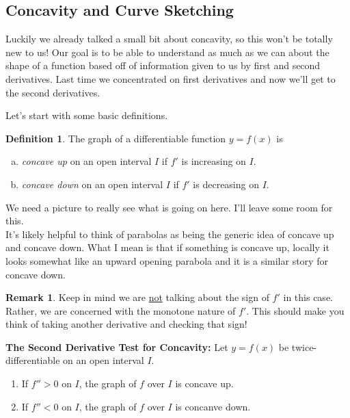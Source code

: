 \documentclass[leqno]{article}
\theoremstyle{definition}
\newtheorem{definition}{Definition}[section]
\newtheorem{remark}{Remark}[section]
\theoremstyle{remark}
\theoremstyle{theorem}
\begin{document}
\subsection{Concavity and Curve Sketching}

Luckily we already talked a small bit about concavity, so this won't be totally new to us! Our goal is to be able to understand as much as we can about the shape of a function based off of information given to us by first and second derivatives.  Last time we concentrated on first derivatives and now we'll get to the second derivatives.

Let's start with some basic definitions.

\begin{definition}
The graph of a differentiable function $y=f(x)$ is
\begin{enumerate}[(a)]
\item \emph{concave up} on an open interval $I$ if $f'$ is increasing on $I$. 
\item \emph{concave down} on an open interval $I$ if $f'$ is decreasing on $I$.
\end{enumerate}
\end{definition}

We need a picture to really see what is going on here.  I'll leave some room for this.
\vspace*{5cm}\\

It's likely helpful to think of parabolas as being the generic idea of concave up and concave down.  What I mean is that if something is concave up, locally it looks somewhat like an upward opening parabola and it is a similar story for concave down.

\begin{remark}
Keep in mind we are \underline{not} talking about the sign of $f'$ in this case.  Rather, we are concerned with the monotone nature of $f'$.  This should make you think of taking another derivative and checking that sign!
\end{remark}

\noindent \textbf{The Second Derivative Test for Concavity:} Let $y=f(x)$ be twice-differentiable on an open interval $I$.
\begin{enumerate}[1.]
\item If $f''>0$ on $I$, the graph of $f$ over $I$ is concave up.
\item If $f''<0$ on $I$, the graph of $f$ over $I$ is concanve down.
\end{enumerate}
\end{document}
